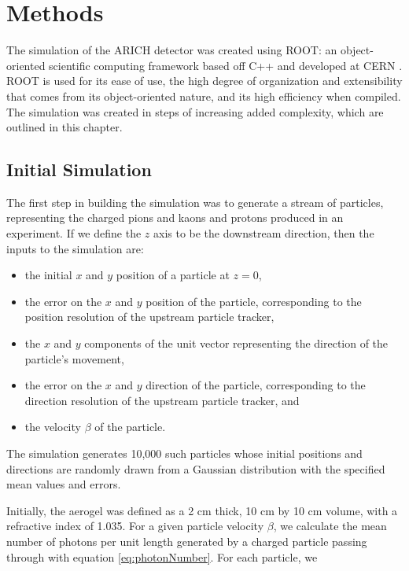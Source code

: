
\chapter{Methods}
\label{ch:Methods}
The simulation of the ARICH detector was created using \textsc{ROOT}: an object-oriented scientific computing framework based off C++ and developed at CERN \cite{root}.
\textsc{ROOT} is used for its ease of use, the high degree of organization and extensibility that comes from its object-oriented nature, and its high efficiency when compiled.
The simulation was created in steps of increasing added complexity, which are outlined in this chapter.


\section{Initial Simulation}
\label{sec:experiment}
The first step in building the simulation was to generate a stream of particles, representing the charged pions and kaons and protons produced in an experiment.
If we define the $z$ axis to be the downstream direction, then the inputs to the simulation are:
\begin{itemize}
\item the initial $x$ and $y$ position of a particle at $z=0$,
\item the error on the $x$ and $y$ position of the particle, corresponding to the position resolution of the upstream particle tracker,
\item the $x$ and $y$ components of the unit vector representing the direction of the particle's movement,
\item the error on the $x$ and $y$ direction of the particle, corresponding to the direction resolution of the upstream particle tracker, and
\item the velocity $\beta$ of the particle.
\end{itemize} 
The simulation generates 10,000 such particles whose initial positions and directions are randomly drawn from a Gaussian distribution with the specified mean values and errors. 

Initially, the aerogel was defined as a 2 cm thick, 10 cm by 10 cm volume, with a refractive index of 1.035. 
For a given particle velocity $\beta$, we calculate the mean number of photons per unit length generated by a charged particle passing through with equation \ref{eq:photonNumber}. For each particle, we 

